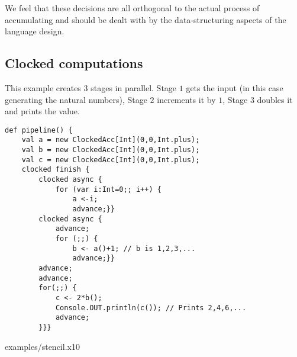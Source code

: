 We feel that these decisions are all orthogonal to the actual process
of accumulating and should be dealt with by the data-structuring
aspects of the language design.

\subsection{Clocked computations}

\begin{example}[Pipeline]
This example creates $3$ stages in parallel. Stage $1$ gets the input
(in this case generating the natural numbers), Stage $2$ increments it
by $1$, Stage $3$ doubles it and prints the value.
\begin{lstlisting}
def pipeline() {
    val a = new ClockedAcc[Int](0,0,Int.plus);
    val b = new ClockedAcc[Int](0,0,Int.plus);
    val c = new ClockedAcc[Int](0,0,Int.plus);
    clocked finish {
        clocked async {
            for (var i:Int=0;; i++) {
                a <-i;
                advance;}}
        clocked async {
            advance;
            for (;;) {
                b <- a()+1; // b is 1,2,3,...
                advance;}}
        advance;
        advance;
        for(;;) {
            c <- 2*b();
            Console.OUT.println(c()); // Prints 2,4,6,...
            advance;
        }}}
  \end{lstlisting}
\end{example}

 {examples/stencil.x10}
